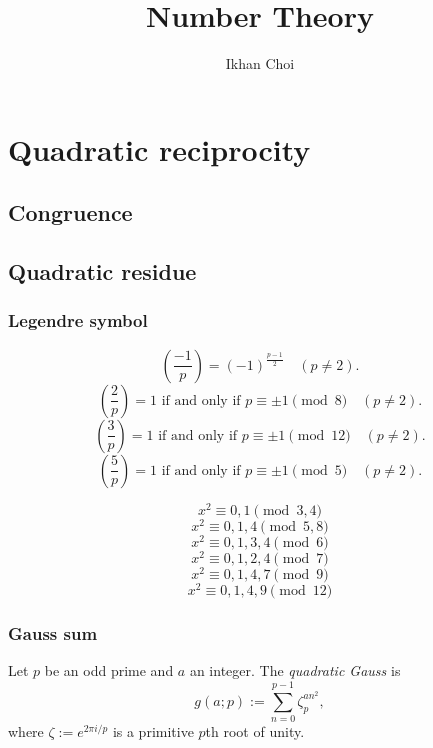 \documentclass{../../large}
\begin{document}
\title{Number Theory}
\author{Ikhan Choi}
\maketitle
\tableofcontents

\part{Quadratic reciprocity}

\chapter{Congruence}


\chapter{Quadratic residue}

\section{Legendre symbol}
\begin{prb}
\[\left(\frac{-1}p\right)=(-1)^{\frac{p-1}2}\quad(p\ne2).\]
\[\left(\frac2p\right)=1\text{ if and only if }p\equiv\pm1\pmod8\quad(p\ne2).\]
\[\left(\frac3p\right)=1\text{ if and only if }p\equiv\pm1\pmod{12}\quad(p\ne2).\]
\[\left(\frac5p\right)=1\text{ if and only if }p\equiv\pm1\pmod5\quad(p\ne2).\]
\end{prb}
\begin{prb}
\[x^2\equiv0,1\pmod{3,4}\]
\[x^2\equiv0,1,4\pmod{5,8}\]
\[x^2\equiv0,1,3,4\pmod{6}\]
\[x^2\equiv0,1,2,4\pmod{7}\]
\[x^2\equiv0,1,4,7\pmod{9}\]
\[x^2\equiv0,1,4,9\pmod{12}\]
\end{prb}



\section{Gauss sum}

\begin{prb}
Let $p$ be an odd prime and $a$ an integer.
The \emph{quadratic Gauss} is
\[g(a;p):=\sum_{n=0}^{p-1}\zeta_p^{an^2},\]
where $\zeta:=e^{2\pi i/p}$ is a primitive $p$th root of unity.
\end{prb}
\begin{pf}


\end{pf}
\end{document}
